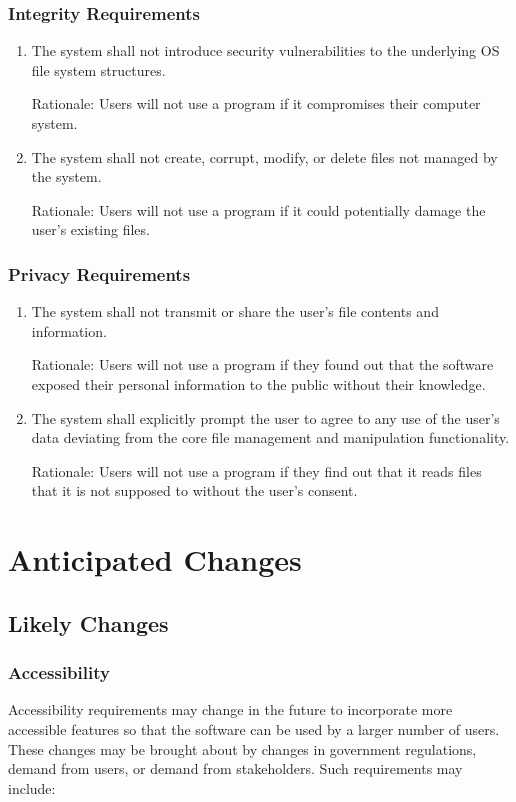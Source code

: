 \documentclass{article}
\begin{document}
\subsubsection{Integrity Requirements}
\begin{enumerate}[{I}NT1]
\item The system shall not introduce security vulnerabilities to the underlying OS file system structures.

Rationale: Users will not use a program if it compromises their computer system.
\item The system shall not create, corrupt, modify, or delete files not managed by the system.

Rationale: Users will not use a program if it could potentially damage the user's existing files.
\end{enumerate}

\subsubsection{Privacy Requirements}
\begin{enumerate}[PR{I}1]
\item The system shall not transmit or share the user's file contents and information.

Rationale: Users will not use a program if they found out that the software exposed their personal information to the public without their knowledge.
\item The system shall explicitly prompt the user to agree to any use of the user's data deviating from the core file management and manipulation functionality.

Rationale: Users will not use a program if they find out that it reads files that it is not supposed to without the user's consent.
\end{enumerate}

\section{Anticipated Changes}
\subsection{Likely Changes}
\subsubsection{Accessibility}
Accessibility requirements may change in the future to incorporate more accessible features so that the software can be used by a larger number of users. These changes may be brought about by changes in government regulations, demand from users, or demand from stakeholders. Such requirements may include:
\end{document}
